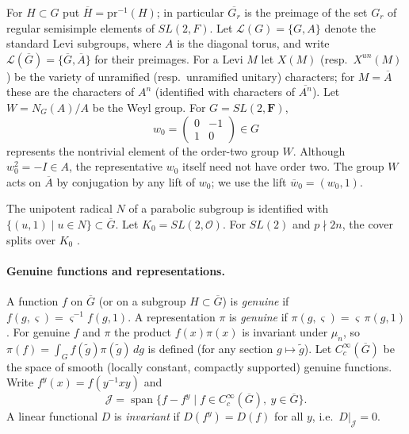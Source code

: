 \documentclass[12pt,letterpaper]{article}
\theoremstyle{definition}
\theoremstyle{remark}
\newcommand{\F}{\mathbf{F}}
\newcommand{\bG}{\overline{G}}
\newcommand{\bA}{\overline{A}}
\newcommand{\bw}{\overline{w}}
\newcommand{\pr}{\mathrm{pr}}
\newcommand{\Span}{\operatorname{span}}
\newcommand{\sJ}{\mathscr J}
\begin{document}
For $H\subset G$ put $\overline H=\pr^{-1}(H)$; in particular $\overline{G_r}$ is the preimage of the set $G_r$ of regular semisimple elements of $SL(2,F)$. Let $\mathcal L(G)=\{G,A\}$ denote the standard Levi subgroups, where $A$ is the diagonal torus, and write $\mathcal L(\bG)=\{\bG,\bA\}$ for their preimages. For a Levi
$M$ let $X(M)$ (resp.\ $X^{un}(M)$) be the variety of unramified (resp.\ unramified unitary)
characters; for $M=\bA$ these are the characters of $A^n$ (identified with characters of
$\overline{A^n}$). Let $W=N_G(A)/A$ be the Weyl group. For $G=SL(2,\F)$,
\[
w_0=\begin{pmatrix}0&-1\\1&0\end{pmatrix}\in G
\]
represents the nontrivial element of the order-two group $W$.  Although $w_0^2=-I\in A$, the representative $w_0$ itself need not have order two. The
group $W$ acts on $\bA$ by conjugation by any lift of $w_0$; we use the lift $\bw_0=(w_0,1)$.

The unipotent radical $N$ of a parabolic subgroup is identified with $\{(u,1)\mid u\in N\}\subset\bG$.
Let $K_0=SL(2,\mathcal O)$. For $SL(2)$ and $p\nmid 2n$, the cover splits over $K_0$ \cite{Ge76}.

\paragraph{Genuine functions and representations.} A function $f$ on $\bG$ (or on a subgroup
$H\subset \bG$) is \emph{genuine} if $f(g,\varsigma)=\varsigma^{-1}f(g,1)$. A representation $\pi$ is
\emph{genuine} if $\pi(g,\varsigma)=\varsigma\,\pi(g,1)$. For genuine $f$ and $\pi$ the product
$f(x)\pi(x)$ is invariant under $\mu_n$, so $\pi(f)=\int_G f(\tilde g)\pi(\tilde g)\,dg$ is defined
(for any section $g\mapsto\tilde g$). Let $C_c^\infty(\bG)$ be the space of smooth (locally constant,
compactly supported) genuine functions. Write $f^y(x)=f(y^{-1}xy)$ and
\[
\sJ=\Span\{f-f^y\mid f\in C_c^\infty(\bG),\ y\in\bG\}.
\]
A linear functional $D$ is \emph{invariant} if $D(f^y)=D(f)$ for all $y$, i.e.\ $D|_{\sJ}=0$.
\end{document}
